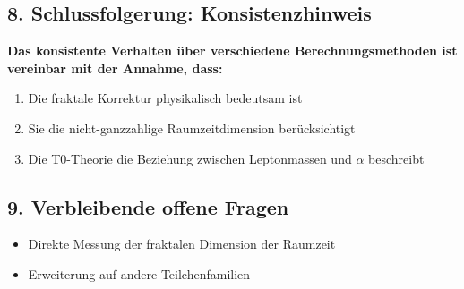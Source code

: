 \subsection{8. Schlussfolgerung: Konsistenzhinweis}

\begin{tcolorbox}[colback=red!5!white,colframe=red!75!black]
	\textbf{Das konsistente Verhalten über verschiedene Berechnungsmethoden ist vereinbar mit der Annahme, dass:}
	\begin{enumerate}
		\item Die fraktale Korrektur physikalisch bedeutsam ist
		\item Sie die nicht-ganzzahlige Raumzeitdimension berücksichtigt
		\item Die T0-Theorie die Beziehung zwischen Leptonmassen und $\alpha$ beschreibt
	\end{enumerate}
\end{tcolorbox}

\subsection{9. Verbleibende offene Fragen}

\begin{itemize}
	\item Direkte Messung der fraktalen Dimension der Raumzeit
	\item Erweiterung auf andere Teilchenfamilien
\end{itemize}
